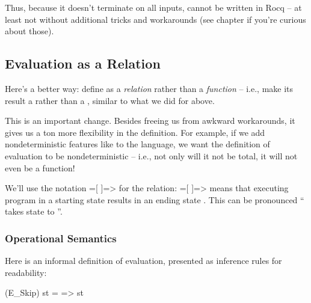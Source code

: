 \documentclass[12pt]{report}
\begin{document}
    Thus, because it doesn't terminate on all inputs, 
    cannot be written in Rocq -- at least not without additional tricks
    and workarounds (see chapter  if you're curious
    about those). 
\begin{coqdoccode}
\coqdocemptyline
\end{coqdoccode}
\subsection{Evaluation as a Relation}



 Here's a better way: define  as a \textit{relation} rather than a
    \textit{function} -- i.e., make its result a  rather than a
    , similar to what we did for  above. 

 This is an important change.  Besides freeing us from awkward
    workarounds, it gives us a ton more flexibility in the definition.
    For example, if we add nondeterministic features like  to the
    language, we want the definition of evaluation to be
    nondeterministic -- i.e., not only will it not be total, it will
    not even be a function! 

 We'll use the notation  =[  ]=>  for the  relation:
     =[  ]=>  means that executing program  in a starting
    state  results in an ending state .  This can be
    pronounced `` takes state  to ''. 
\begin{coqdoccode}
\coqdocemptyline
\end{coqdoccode}
\subsubsection{Operational Semantics}



 Here is an informal definition of evaluation, presented as inference
    rules for readability:
\par
\noindent\hrulefill\par
\noindent{}                            (E\_Skip)
                           st =  => st
\end{document}
